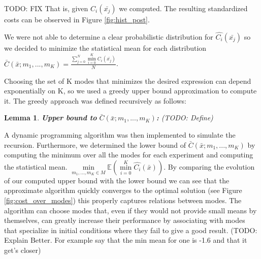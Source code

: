 \documentclass[12,twoside]{TFG-GM}
\newtheorem{lemma}[theorem]{Lemma}
\theoremstyle{definition}
\theoremstyle{remark}
\newcommand*\diff[1]{\bar{#1}}
\begin{document}


TODO: FIX That is, given $C_i(\diff{x_j})$ we computed. The resulting standardized costs can be observed in Figure \ref{fig:hist_post}.

We were not able to determine a clear probabilistic distribution for $\hat{C_i}(\diff{x_j})$ so we decided to minimize the statistical mean for each distribution $ \bar{C}(\diff{x}; m_1, ..., m_K) = \frac{\sum\limits_{j=0}^{N}{\min\limits_{i = 0}^{K}{C_i(\diff{x_j})}}}{N}$.

Choosing the set of K modes that minimizes the desired expression can depend exponentially on K, so we used a greedy upper bound approximation to compute it. The greedy approach was defined recursively as follows:
\begin{lemma}\textbf{Upper bound to } $ \bar{C}(\diff{x}; m_1, ..., m_K)$\textbf{:}
(TODO: Define)
\end{lemma}
A dynamic programming algorithm was then implemented to simulate the recursion. Furthermore, we determined the lower bound of $ \bar{C}(\diff{x}; m_1, ..., m_K)$ by computing the minimum over all the modes for each experiment and computing the statistical mean.  $\min\limits_{m_1, ..., m_K \in M}\mathbb{E}(\min\limits_{i = 0}^{K}{\hat{C_i}(\diff{x})})$. By comparing the evolution of our computed upper bound with the lower bound we can see that the approximate algorithm quickly converges to the optimal solution (see Figure \ref{fig:cost_over_modes}) this properly captures relations between modes. The algorithm can choose modes that, even if they would not provide small means by themselves, can greatly increase their performance by associating with modes that specialize in initial conditions where they fail to give a good result. (TODO: Explain Better. For example say that the min mean for one is -1.6 and that it get's closer)
\end{document}
